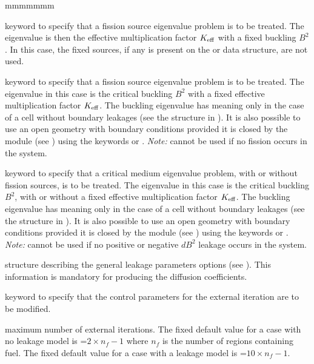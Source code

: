 \begin{ListeDeDescription}{mmmmmmm}
\item[\moc{K}] keyword to specify that a fission source eigenvalue problem is
to be treated. The eigenvalue is then the effective multiplication factor $K_{\rm eff}$ with a
fixed buckling $B^2$. In this case, the fixed sources, if any is present on the
 or  data structure, are not used.  

\item[\moc{B}] keyword to specify that a fission source eigenvalue problem is
to be treated. The eigenvalue in this case is the critical buckling $B^2$ with a fixed
effective multiplication factor $K_{\rm eff}$. The buckling eigenvalue has meaning only in the
case of a cell without boundary leakages (see the structure  in
). It is also possible to use an open geometry with
 boundary conditions  provided it is closed by the  module
(see ) using the keywords  or . {\sl Note:} 
cannot be used if no fission occurs in the system.

\item[\moc{L}] keyword to specify that a critical medium eigenvalue problem, with or without
fission sources, is to be treated. The eigenvalue in this case is the critical buckling $B^2$,
with or without a fixed effective multiplication factor $K_{\rm eff}$. The buckling eigenvalue has meaning only
in the case of a cell without boundary leakages (see the structure  in
). It is also possible to use an open geometry with
 boundary conditions  provided it is closed by the  module
(see ) using the keywords  or . {\sl Note:} 
cannot be used if no positive or negative $dB^2$ leakage occurs in the system.

\item[\dstr{descleak}] structure describing the general leakage parameters
options (see ). This information is mandatory for producing the
diffusion coefficients.

\item[\moc{EXTE}] keyword to specify that the control parameters for the
external iteration are to be modified. 

\item[\dusa{maxout}] maximum number of external iterations. The fixed default
value for a case with no leakage model is =$2\times n_{f}-1$ where
$n_{f}$ is the number of regions containing fuel. The fixed default value for a
case with a leakage model is =$10\times n_{f}-1$.


\end{ListeDeDescription}
